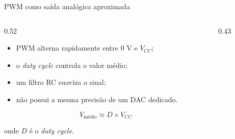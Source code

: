 \begin{frame}{PWM como saída analógica aproximada}
    \begin{columns}
        \begin{column}{0.52\textwidth}
            \begin{itemize}
                \item PWM alterna rapidamente entre 0 V e $V_{CC}$;
                \item o \textit{duty cycle} controla o valor médio;
                \item um filtro RC suaviza o sinal;
                \item não possui a mesma precisão de um DAC dedicado.
            \end{itemize}

            \[
                V_{\text{médio}} \approx D \times V_{CC}
            \]

            onde $D$ é o \textit{duty cycle}.
        \end{column}

        \begin{column}{0.43\textwidth}
            \centering
        \end{column}
    \end{columns}
\end{frame}